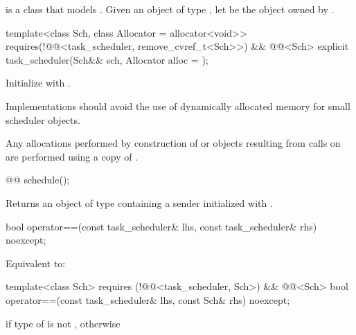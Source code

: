 \pnum
{} is a class that models
.
Given an object  of type , let
 be the object owned by .

\begin{itemdecl}
template<class Sch, class Allocator = allocator<void>>
  requires(!@@<task_scheduler, remove_cvref_t<Sch>>) && @@<Sch>
explicit task_scheduler(Sch&& sch, Allocator alloc = {});
\end{itemdecl}
\begin{itemdescr}
\pnum
\effects
Initialize  with
.

\pnum
\recommended
Implementations should avoid the use of dynamically
allocated memory for small scheduler objects.

\pnum
\remarks
Any allocations performed by construction of  or
 objects resulting from calls on  are
performed using a copy of .
\end{itemdescr}

%
\begin{itemdecl}
@@ schedule();
\end{itemdecl}
\begin{itemdescr}
\pnum
\effects
Returns an object of type  containing a sender
initialized with .
\end{itemdescr}

%
\begin{itemdecl}
bool operator==(const task_scheduler& lhs, const task_scheduler& rhs) noexcept;
\end{itemdecl}
\begin{itemdescr}
\pnum
\effects
Equivalent to: 
\end{itemdescr}

%
\begin{itemdecl}
template<class Sch>
  requires (!@@<task_scheduler, Sch>)
        && @@<Sch>
bool operator==(const task_scheduler& lhs, const Sch& rhs) noexcept;
\end{itemdecl}
\begin{itemdescr}
\pnum
\returns
{} if type of  is not ,
otherwise 
\end{itemdescr}

